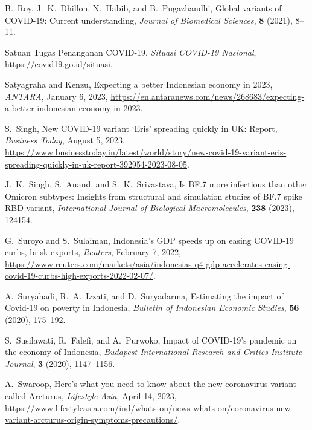 \documentclass[11pt,reqno]{amsart}
\begin{document}
\begin{thebibliography}{99}
     B.\ Roy, J.\ K.\ Dhillon, N.\ Habib, and B.\ Pugazhandhi,
     \newblock Global variants of COVID-19: Current understanding,
     \newblock \emph{Journal of Biomedical Sciences}, \textbf{8} (2021), 8--11.

     Satuan Tugas Penanganan COVID-19,
     \newblock \emph{Situasi COVID-19 Nasional},
     \newblock \ul{https://covid19.go.id/situasi}.

     Satyagraha and Kenzu,
     \newblock Expecting a better Indonesian economy in 2023,
     \newblock \emph{ANTARA}, January 6, 2023, \ul{https://en.antaranews.com/news/268683/expecting-a-better-indonesian-economy-in-2023}.

     S.\ Singh,
     \newblock New COVID-19 variant `Eris' spreading quickly in UK: Report,
     \newblock \emph{Business Today}, August 5, 2023, \ul{https://www.businesstoday.in/latest/world/story/new-covid-19-variant-eris-spreading-quickly-in-uk-report-392954-2023-08-05}.

     J.\ K.\ Singh, S.\ Anand, and S.\ K.\ Srivastava,
     \newblock Is BF.7 more infectious than other Omicron subtypes: Insights from structural and simulation studies of BF.7 spike RBD variant,
     \newblock \emph{International Journal of Biological Macromolecules}, \textbf{238} (2023), 124154.

     G.\ Suroyo and S.\ Sulaiman,
     \newblock Indonesia's GDP speeds up on easing COVID-19 curbs, brisk exports,
     \newblock \emph{Reuters}, February 7, 2022, \ul{https://www.reuters.com/markets/asia/indonesias-q4-gdp-accelerates-easing-covid-19-curbs-high-exports-2022-02-07/}.

     A.\ Suryahadi, R.\ A.\ Izzati, and D.\ Suryadarma,
     \newblock Estimating the impact of Covid-19 on poverty in Indonesia,
     \newblock \emph{Bulletin of Indonesian Economic Studies}, \textbf{56} (2020), 175--192.

     S.\ Susilawati, R.\ Falefi, and A.\ Purwoko,
     \newblock Impact of COVID-19's pandemic on the economy of Indonesia,
     \newblock \emph{Budapest International Research and Critics Institute-Journal}, \textbf{3} (2020), 1147--1156.

     A.\ Swaroop,
     \newblock Here's what you need to know about the new coronavirus variant called Arcturus,
     \newblock \emph{Lifestyle Asia}, April 14, 2023, \ul{https://www.lifestyleasia.com/ind/whats-on/news-whats-on/coronavirus-new-variant-arcturus-origin-symptoms-precautions/}.


\end{thebibliography}
\end{document}
